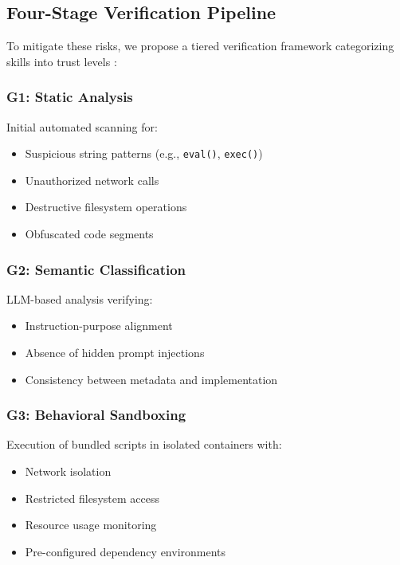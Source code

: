 \documentclass[11pt,a4paper]{article}
\begin{document}
\subsection{Four-Stage Verification Pipeline}

To mitigate these risks, we propose a tiered verification framework categorizing skills into trust levels \cite{alphaxiv2024skills, researchgate2024agentskills}:

\subsubsection{G1: Static Analysis}\label{g1:static}

Initial automated scanning for:

\begin{itemize}
\item Suspicious string patterns (e.g., \texttt{eval()}, \texttt{exec()})
\item Unauthorized network calls
\item Destructive filesystem operations
\item Obfuscated code segments
\end{itemize}

\subsubsection{G2: Semantic Classification}

LLM-based analysis verifying:

\begin{itemize}
\item Instruction-purpose alignment
\item Absence of hidden prompt injections
\item Consistency between metadata and implementation
\end{itemize}

\subsubsection{G3: Behavioral Sandboxing}

Execution of bundled scripts in isolated containers with:

\begin{itemize}
\item Network isolation
\item Restricted filesystem access
\item Resource usage monitoring
\item Pre-configured dependency environments
\end{itemize}
\end{document}
